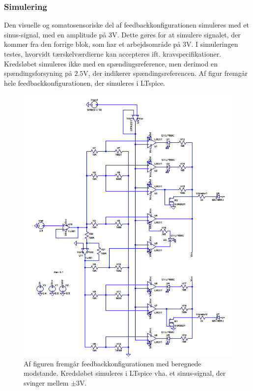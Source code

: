 \subsubsection{Simulering}
Den visuelle og somatosensoriske del af feedbackkonfigurationen simuleres med et sinus-signal, med en amplitude på $3$V. Dette gøres for at simulere signalet, der kommer fra den forrige blok, som har et arbejdsområde på \pm$3$V. I simuleringen testes, hvorvidt tærskelværdierne kan accepteres ift. kravspecifikationer. Kredsløbet simuleres ikke med en spændingsreference, men derimod en spændingsforsyning på $2.5$V, der indikerer spændingsreferencen. Af figur  fremgår hele feedbackkonfigurationen, der simuleres i LTspice.

\begin{figure}[H]
	\centering
	\includegraphics[scale=0.9]{figures/cProblemloesning/komparator_samlet.PNG}
	\caption{Af figuren fremgår feedbackkonfigurationen med beregnede modstande. Kredsløbet simuleres i LTspice vha. et sinus-signal, der svinger mellem $\pm3$V.}
	\label{fig:komparator_samlet}
\end{figure}
 
